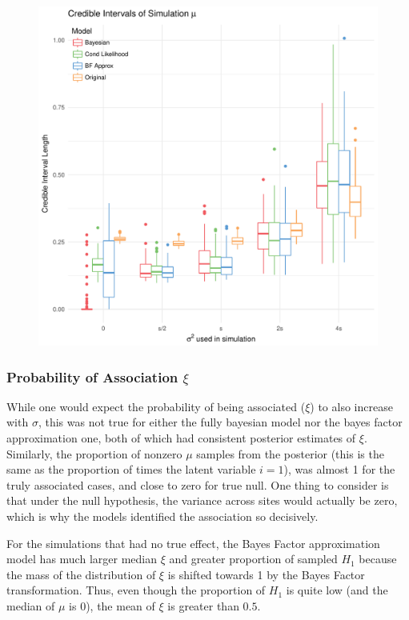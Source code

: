 \documentclass[AMA,STIX1COL]{WileyNJD-v2}\usepackage[]{graphicx}\usepackage[]{color}
\makeatletter
\def\maxwidth{ %
  \ifdim\Gin@nat@width>\linewidth
    \linewidth
  \else
    \Gin@nat@width
  \fi
}
\newenvironment{knitrout}{}{} %
\makeatother
\begin{document}
\begin{figure}
\begin{knitrout}
\color{fgcolor}
\includegraphics[width=\maxwidth]{figure/unnamed-chunk-29-1} 

\end{knitrout}
\end{figure}

\subsubsection{Probability of Association $\xi$}

While one would expect the probability of being associated ($\xi$) to also increase with $\sigma$, this was not true for either the fully bayesian model nor the bayes factor approximation one, both of which had consistent posterior estimates of $\xi$. Similarly, the proportion of nonzero $\mu$ samples from the posterior (this is the same as the proportion of times the latent variable $i = 1$), was almost 1 for the truly associated cases, and close to zero for true null. One thing to consider is that under the null hypothesis, the variance across sites would actually be zero, which is why the models identified the association so decisively.

For the simulations that had no true effect, the Bayes Factor approximation model has much larger median $\xi$ and greater proportion of sampled $H_1$ because the mass of the distribution of $\xi$ is shifted towards 1 by the Bayes Factor transformation. Thus, even though the proportion of $H_1$ is quite low (and the median of $\mu$ is 0), the mean of $\xi$ is greater than $0.5$.
\end{document}
